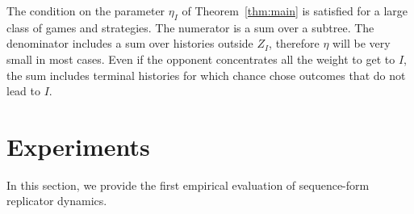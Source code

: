 \documentclass{aamas2014}
\newcommand{\PW}{\mbox{PW}}
\newcommand{\todo}[1]{{\color{red}{\bf #1}}}
\begin{document}
The condition on the parameter $\eta_I$ of Theorem~\ref{thm:main} is satisfied for a large class of games and strategies. 
The numerator is a sum over a subtree. 
The denominator includes a sum over histories outside $Z_I$, therefore $\eta$ will be very small in most cases. 
Even if the opponent concentrates all the weight to get to $I$, the sum includes terminal histories for which chance 
chose outcomes that do not lead to $I$. 









\section{Experiments}
\label{sec:exp}

 
In this section, we provide the first empirical evaluation of sequence-form replicator dynamics. 
\end{document}
